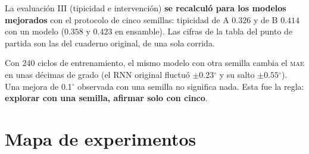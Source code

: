 \documentclass[11pt,a4paper]{article}
\newcommand{\gr}{$^\circ$}
\newcommand{\mae}{\textsc{mae}}
\begin{document}
\begin{cuidado}
La evaluación III (tipicidad e intervención) \textbf{se recalculó para los modelos mejorados} con el protocolo de cinco semillas: tipicidad de A $0.326$ y de B $0.414$ con un modelo ($0.358$ y $0.423$ en ensamble). Las cifras de la tabla del punto de partida son las del cuaderno original, de una sola corrida.
\end{cuidado}

\begin{cuidado}
Con 240 ciclos de entrenamiento, el mismo modelo con otra semilla cambia el \mae{} en unas décimas de grado (el RNN original fluctuó $\pm0.23$\gr{} y su salto $\pm0.55$\gr{}). Una mejora de 0.1\gr{} observada con una semilla no significa nada. Esta fue la regla: \textbf{explorar con una semilla, afirmar solo con cinco}.
\end{cuidado}

\section{Mapa de experimentos}
\label{sec:mapa}
\end{document}
